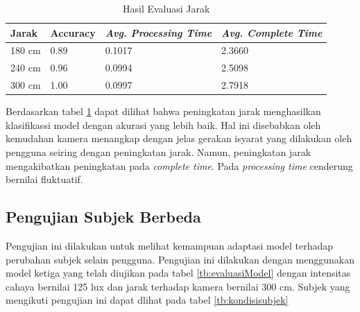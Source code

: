 \begin{table}[H]
  \caption{Hasil Evaluasi Jarak}
  \label{tb:evaluasiJarak}
  \centering
  \begin{tabular}{llll}
    \hline
    \textbf{Jarak} & \textbf{Accuracy} & \emph{\textbf{Avg. Processing Time}} & \emph{\textbf{Avg. Complete Time}} \\
    \hline
    180 cm & 0.89 & 0.1017 & 2.3660 \\
    240 cm & 0.96 & 0.0994 & 2.5098 \\
    300 cm & 1.00 & 0.0997 & 2.7918 \\
    \hline
  \end{tabular}
\end{table}

Berdasarkan tabel \ref{tb:evaluasiJarak} dapat dilihat bahwa peningkatan jarak menghasilkan klasifikassi model dengan akurasi yang lebih baik. Hal ini disebabkan oleh kemudahan kamera menangkap dengan jelas gerakan isyarat yang dilakukan oleh pengguna seiring dengan peningkatan jarak. Namun, peningkatan jarak mengakibatkan peningkatan pada \emph{complete time}. Pada \emph{processing time} cenderung bernilai fluktuatif.

\subsection{Pengujian Subjek Berbeda}
\label{sec:analisissubjek}

Pengujian ini dilakukan untuk melihat kemampuan adaptasi model terhadap perubahan subjek selain pengguna. Pengujian ini dilakukan dengan menggunakan model ketiga yang telah diujikan pada tabel \ref{tb:evaluasiModel} dengan intensitas cahaya bernilai 125 lux dan jarak terhadap kamera bernilai 300 cm. Subjek yang mengikuti pengujian ini dapat dlihat pada tabel \ref{tb:kondisisubjek}

